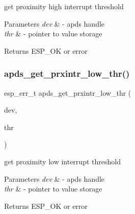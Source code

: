 \begin{DoxyItemize}
\item get proximity high interrupt threshold 
\end{DoxyItemize}


\begin{DoxyParams}{Parameters}
{\em dev} & -\/ apds handle \\
\hline
{\em thr} & -\/ pointer to value storage \\
\hline
\end{DoxyParams}
\begin{DoxyReturn}{Returns}
E\+S\+P\+\_\+\+OK or error 
\end{DoxyReturn}
\mbox{\label{group__APDS9960__ProximityFunctions_ga111701c7f135655d785c45cc1b7c408d}} 
\subsubsection{\texorpdfstring{apds\+\_\+get\+\_\+prxintr\+\_\+low\+\_\+thr()}{apds\_get\_prxintr\_low\_thr()}}
{\footnotesize\ttfamily esp\+\_\+err\+\_\+t apds\+\_\+get\+\_\+prxintr\+\_\+low\+\_\+thr (\begin{DoxyParamCaption}\item[{\hyperlink{structAPDS9960__Driver}{A\+P\+D\+S\+\_\+\+D\+EV}}]{dev,  }\item[{\hyperlink{vl53l0x__types_8h_aba7bc1797add20fe3efdf37ced1182c5}{uint8\+\_\+t} $\ast$}]{thr }\end{DoxyParamCaption})}




\begin{DoxyItemize}
\item get proximity low interrupt threshold 
\end{DoxyItemize}


\begin{DoxyParams}{Parameters}
{\em dev} & -\/ apds handle \\
\hline
{\em thr} & -\/ pointer to value storage \\
\hline
\end{DoxyParams}
\begin{DoxyReturn}{Returns}
E\+S\+P\+\_\+\+OK or error 
\end{DoxyReturn}
\mbox{\label{group__APDS9960__ProximityFunctions_ga222563d48d4e342479a8f7cf373f655d}} 
